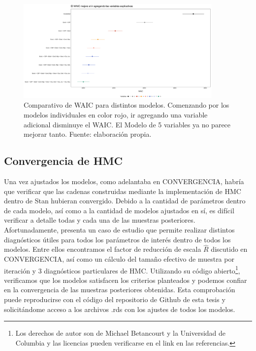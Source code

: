 \begin{figure}[h]
	\centering
	\includegraphics[width = 0.9\textwidth]{Figs/Modelado/Graf_WAIC_Modelos_Compuestos}
	\caption{Comparativo de WAIC para distintos modelos. Comenzando por los modelos individuales en color rojo, ir agregando una variable adicional disminuye el WAIC. El Modelo de 5 variables ya no parece mejorar tanto. Fuente: elaboración propia.}
	\label{fig:Compara_WAIC_Compuestos}
\end{figure}

\subsection*{Convergencia de HMC}

Una vez ajustados los modelos, como adelantaba en {\color{Red} CONVERGENCIA}, habría que verificar que las cadenas construidas mediante la implementación de HMC dentro de Stan hubieran convergido. Debido a la cantidad de parámetros dentro de cada modelo, así como a la cantidad de modelos ajustados en sí, es difícil verificar a detalle todas y cada una de las muestras posteriores. Afortunadamente, \textcite{BetancourtRStanWorkflow} presenta un caso de estudio que permite realizar distintos diagnósticos útiles para todos los parámetros de interés dentro de todos los modelos. Entre ellos encontramos el factor de reducción de escala $\hat{R}$ discutido en {\color{Red} CONVERGENCIA}, así como un cálculo del tamaño efectivo de muestra por iteración y 3 diagnósticos particulares de HMC. Utilizando su código abierto\footnote{Los derechos de autor son de Michael Betancourt y la Universidad de Columbia y las licencias pueden verificarse en el link en las referencias.}, verificamos que los modelos satisfacen los criterios planteados y podemos confiar en la convergencia de las muestras posteriores obtenidas. {\color{Red} Esta comprobación puede reproducirse con el código del repositorio de Github de esta tesis y solicitándome acceso a los archivos .rds con los ajustes de todos los modelos.}\\

